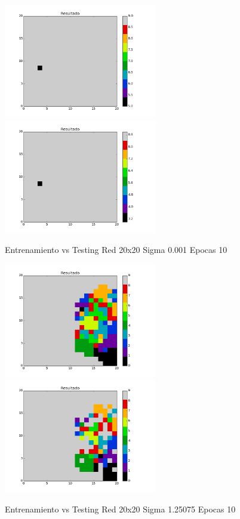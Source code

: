 \includegraphics[width=0.5\textwidth]{img/EJ2_Sigma/train_M_20_sigma_0_001_epocas_5}
\includegraphics[width=0.5\textwidth]{img/EJ2_Sigma/test_M_20_sigma_0_001_epocas_5}
{\center \footnotesize Entrenamiento vs Testing Red 20x20 Sigma 0.001 Epocas 10\par}

\includegraphics[width=0.5\textwidth]{img/EJ2_Sigma/train_M_20_sigma_1_25075_epocas_5}
\includegraphics[width=0.5\textwidth]{img/EJ2_Sigma/test_M_20_sigma_1_25075_epocas_5}
{\center \footnotesize Entrenamiento vs Testing Red 20x20 Sigma 1.25075 Epocas 10\par}


